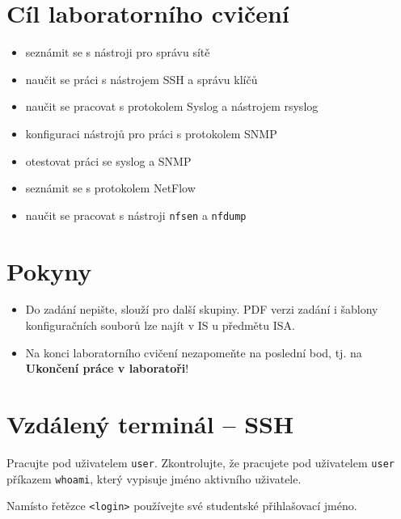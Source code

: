 %
\section*{Cíl laboratorního cvičení}
\begin{itemize}
  \item seznámit se s nástroji pro správu sítě
  \item naučit se práci s nástrojem SSH a správu klíčů 
  \item naučit se pracovat s protokolem Syslog a nástrojem rsyslog
  \item konfiguraci nástrojů pro práci s protokolem SNMP
  \item otestovat práci se syslog a SNMP
  \item seznámit se s protokolem NetFlow
  \item naučit se pracovat s nástroji {\tt nfsen} a {\tt nfdump}
\end{itemize}

\section*{Pokyny}
\begin{itemize}
  \item Do zadání nepište, slouží pro další skupiny. PDF verzi zadání
  i šablony konfiguračních souborů lze najít v IS u předmětu ISA.
  \item Na konci laboratorního cvičení nezapomeňte na poslední bod,
  tj. na {\bf Ukončení práce v laboratoři}!
\end{itemize}

\newpage
\section{Vzdálený terminál -- SSH}

Pracujte pod uživatelem {\tt user}. Zkontrolujte, že pracujete pod
uživatelem {\tt user} příkazem {\tt whoami}, který vypisuje jméno aktivního
uživatele.

Namísto řetězce {\tt <login>} používejte své studentské přihlašovací jméno.

